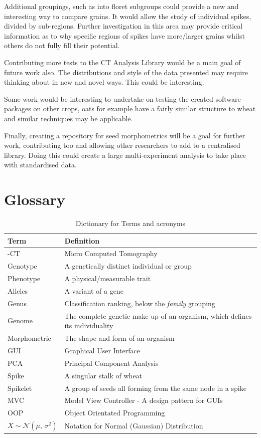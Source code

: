 \documentclass[11pt]{report}
\begin{document}
Additional groupings, such as into floret subgroups could provide a new and interesting way to compare grains. It would allow the study of individual spikes, divided by sub-regions. Further investigation in this area may provide critical information as to why specific regions of spikes have more/larger grains whilst others do not fully fill their potential.

Contributing more tests to the CT Analysis Library would be a main goal of future work also. The distributions and style of the data presented may require thinking about in new and novel ways. This could be interesting.

Some work would be interesting to undertake on testing the created software packages on other crops, oats for example have a fairly similar structure to wheat and similar techniques may be applicable.

Finally, creating a repository for seed morphometrics will be a goal for further work, contributing too and allowing other researchers to add to a centralised library. Doing this could create a large multi-experiment analysis to take place with standardised data.


\appendix

\chapter{Glossary}
\label{sec:org8bdcd88}
\begin{table}[htbp]
\caption{\label{tab:org5003dd2}
Dictionary for Terms and acronyms}
\centering
\begin{tabularx}{\textwidth}{|l|X|}
\hline
\textbf{Term} & \textbf{Definition}\\
\hline
\textmu{}-CT & Micro Computed Tomography\\
\hline
Genotype & A genetically distinct individual or group\\
\hline
Phenotype & A physical/measurable trait\\
\hline
Alleles & A variant of a gene\\
\hline
Genus & Classification ranking, below the \emph{family} grouping\\
\hline
Genome & The complete genetic make up of an organism, which defines its individuality\\
\hline
Morphometric & The shape and form of an organism\\
\hline
GUI & Graphical User Interface\\
\hline
PCA & Principal Component Analysis\\
\hline
Spike & A singular stalk of wheat\\
\hline
Spikelet & A group of seeds all forming from the same node in a spike\\
\hline
MVC & Model View Controller - A design pattern for GUIs\\
\hline
OOP & Object Orientated Programming\\
\hline
\(X \sim \mathcal{N}(\mu,\,\sigma^{2})\) & Notation for Normal (Gaussian) Distribution\\
\hline
\end{tabularx}
\end{table}
\end{document}
